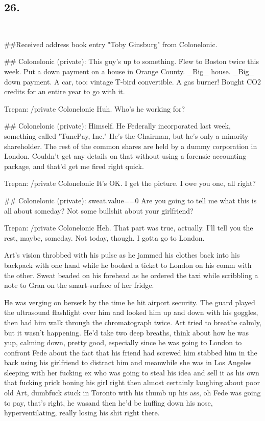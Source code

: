 \subsection{26.}
{\raggedright
\tt
\addtolength{\parskip}{0.5\baselineskip}

\#\#Received address book entry "Toby Ginsburg" from Colonelonic.

\#\# Colonelonic (private): This guy's up to something. Flew to
Boston twice this week. Put a down payment on a house in Orange
County. \_Big\_ house. \_Big\_ down payment. A car, too: vintage
T-bird convertible. A gas burner! Bought CO2 credits for an entire
year to go with it.

Trepan: /private Colonelonic Huh. Who's he working for?

\#\# Colonelonic (private): Himself. He Federally incorporated last
week, something called "TunePay, Inc." He's the Chairman, but he's
only a minority shareholder. The rest of the common shares are held
by a dummy corporation in London. Couldn't get any details on that
without using a forensic accounting package, and that'd get me
fired right quick.

Trepan: /private Colonelonic It's OK. I get the picture. I owe you
one, all right?

\#\# Colonelonic (private): sweat.value==0 Are you going to tell me
what this is all about someday? Not some bullshit about your
girlfriend?

Trepan: /private Colonelonic Heh. That part was true, actually.
I'll tell you the rest, maybe, someday. Not today, though. I gotta
go to London.

}

Art’s vision throbbed with his pulse as he jammed his clothes back
into his backpack with one hand while he booked a ticket to London
on his comm with the other. Sweat beaded on his forehead as he
ordered the taxi while scribbling a note to Gran on the
smart-surface of her fridge.

He was verging on berserk by the time he hit airport security. The
guard played the ultrasound flashlight over him and looked him up
and down with his goggles, then had him walk through the
chromatograph twice. Art tried to breathe calmly, but it wasn’t
happening. He’d take two deep breaths, think about how he was yup,
calming down, pretty good, especially since he was going to London
to confront Fede about the fact that his friend had screwed him
stabbed him in the back using his girlfriend to distract him and
meanwhile she was in Los Angeles sleeping with her fucking ex who
was going to steal his idea and sell it as his own that fucking
prick boning his girl right then almost certainly laughing about
poor old Art, dumbfuck stuck in Toronto with his thumb up his ass,
oh Fede was going to pay, that’s right, he was{\dash}and then he’d be
huffing down his nose, hyperventilating, really losing his shit
right there.

